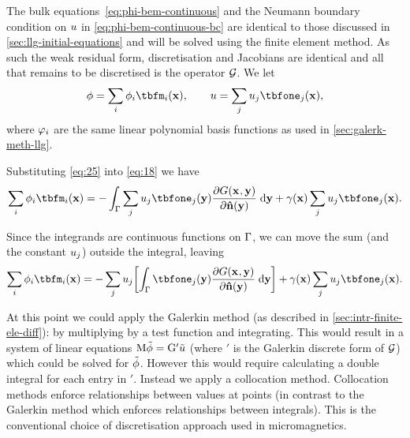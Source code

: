 The bulk equations~\cref{eq:phi-bem-continuous} and the Neumann boundary condition on $u$ in \cref{eq:phi-bem-continuous-bc} are identical to those discussed in \cref{sec:llg-initial-equations} and will be solved using the finite element method.
As such the weak residual form, discretisation and Jacobians are identical and all that remains to be discretised is the operator $\mathcal{G}$.
We let
\begin{equation}
  \phim = \sum_\ibasis \phim_{\ibasis} \tbfm_{\ibasis}(\xv),
  \qquad
  \phione = \sum_\ibasisb \phione_{\ibasisb} \tbfone_{\ibasisb}(\xv),
  \label{eq:25}
\end{equation}
where $\varphi_i$ are the same linear polynomial basis functions as used in \cref{sec:galerk-meth-llg}.

Substituting \cref{eq:25} into \cref{eq:18} we have
\begin{equation}
  \sum_\ibasis \phim_{\ibasis} \tbfm_{\ibasis}(\xv) =
  - \int_{\boundd} \sum_\ibasisb \phione_{\ibasisb} \tbfone_{\ibasisb}(\yv)
  \pd{\Green}{\nv(\yv)} \d \yv
   + \gamma(\xv) \sum_\ibasisb \phione_{\ibasisb} \tbfone_{\ibasisb}(\xv).
\end{equation}

Since the integrands are continuous functions on ${\Gamma}$, we can move the sum (and the constant $u_{{j}}$) outside the integral, leaving
\begin{equation}
  \sum_\ibasis \phim_{\ibasis} \tbfm_{\ibasis}(\xv) =
  - \sum_\ibasisb  \phione_{\ibasisb}  \bigs{\int_{\boundd} \tbfone_{\ibasisb}(\yv)
    \pd{\Green}{\nv(\yv)} \d \yv }
  + \gamma(\xv) \sum_\ibasisb \phione_{\ibasisb} \tbfone_{\ibasisb}(\xv).
  \label{eq:27}
\end{equation}

At this point we could apply the Galerkin method (as described in \cref{sec:intr-finite-ele-diff}): by multiplying by a test function and integrating.
This would result in a system of linear equations $\mathrm{M} \tilde{\phi} = {\mathbf{\mathrm{G}}}' \tilde{u}$ (where $\bm'$ is the Galerkin discrete form of $\mathcal{G}$) which could be solved for $\tilde{\phi}$.
However this would require calculating a double integral for each entry in $\bm'$.
Instead we apply a collocation method.
Collocation methods enforce relationships between values at points (in contrast to the Galerkin method which enforces relationships between integrals).
This is the conventional choice of discretisation approach used in micromagnetics.


